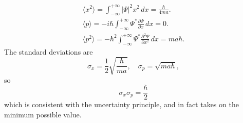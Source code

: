 \documentclass{article}
\begin{document}
\begin{enumerate}[(a)]
\begin{gather*}
      \langle x^2 \rangle = \int_{-\infty}^{+\infty} |\Psi|^2x^2 \,dx =
        \frac{\hbar}{4ma}. \\
      \langle p \rangle
      = -i\hbar \int_{-\infty}^{+\infty}
        \Psi^*\frac{\partial \Psi}{\partial x}
      \,dx = 0. \\
      \langle p^2 \rangle
      = -\hbar^2 \int_{-\infty}^{+\infty}
        \Psi^*\frac{\partial^2 \Psi}{\partial x^2}
      \,dx
      = ma\hbar.
    \end{gather*} The standard deviations are \[
      \sigma_x = \frac{1}{2}\sqrt{\frac{\hbar}{ma}}, \quad
      \sigma_p = \sqrt{ma\hbar},
    \] so \[
      \sigma_x \sigma_p = \frac{\hbar}{2}
    \] which is consistent with the uncertainty principle, and in fact takes on
    the minimum possible value.
\end{enumerate}
\end{document}
